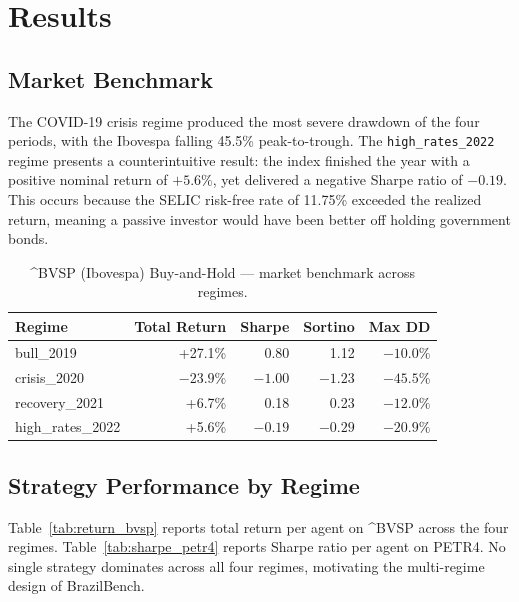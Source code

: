 \documentclass{article}
\begin{document}
\section{Results}

\subsection{Market Benchmark}

The COVID-19 crisis regime produced the most severe drawdown of the four
periods, with the Ibovespa falling 45.5\% peak-to-trough. The
\texttt{high\_rates\_2022} regime presents a counterintuitive result:
the index finished the year with a positive nominal return of $+5.6\%$,
yet delivered a negative Sharpe ratio of $-0.19$. This occurs because
the SELIC risk-free rate of 11.75\% exceeded the realized return,
meaning a passive investor would have been better off holding government
bonds.

\begin{table}[h]
\centering
\caption{\^{}BVSP (Ibovespa) Buy-and-Hold --- market benchmark across regimes.}
\label{tab:ibov}
\begin{tabular}{lrrrr}
\toprule
\textbf{Regime} & \textbf{Total Return} & \textbf{Sharpe}
  & \textbf{Sortino} & \textbf{Max DD} \\
\midrule
bull\_2019     & +27.1\% &  0.80 &  1.12 & $-10.0\%$ \\
crisis\_2020   & $-23.9\%$ & $-1.00$ & $-1.23$ & $-45.5\%$ \\
recovery\_2021 & +6.7\%  &  0.18 &  0.23 & $-12.0\%$ \\
high\_rates\_2022     & +5.6\%  & $-0.19$ & $-0.29$ & $-20.9\%$ \\
\bottomrule
\end{tabular}
\end{table}

\subsection{Strategy Performance by Regime}

Table~\ref{tab:return_bvsp} reports total return per agent on
\textasciicircum BVSP across the four regimes.
Table~\ref{tab:sharpe_petr4} reports Sharpe ratio per agent on PETR4.
No single strategy dominates across all four regimes, motivating the
multi-regime design of BrazilBench.
\end{document}
